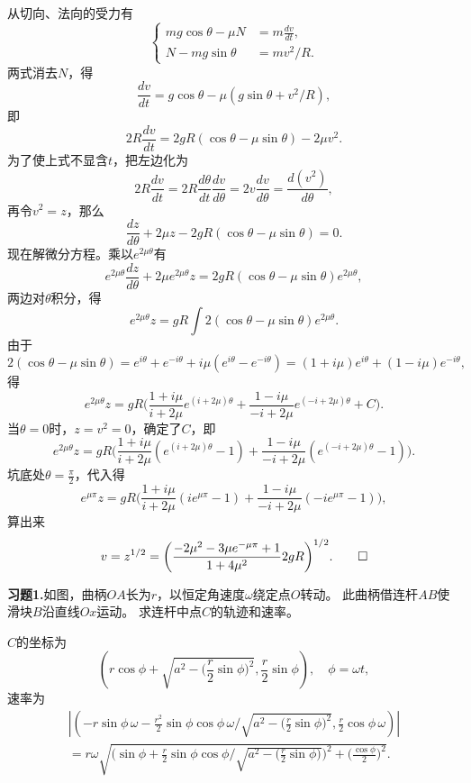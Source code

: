 \begin{proofc}[解答] 从切向、法向的受力有
    \begin{equation*}\left\{\begin{aligned}
        mg\cos\theta-\mu N&=m\frac{dv}{dt},\\
        N-mg\sin\theta&=mv^2/R.
    \end{aligned}\right.\end{equation*}
    两式消去$N$，得
    $$\frac{dv}{dt}=g\cos\theta-\mu(g\sin\theta+v^2/R),$$
    即
    $$2R\frac{dv}{dt}=2gR(\cos\theta-\mu\sin\theta)-2\mu v^2.$$
    为了使上式不显含$t$，把左边化为
    $$2R\frac{dv}{dt}=2R\frac{d\theta}{dt}\frac{dv}{d\theta}
    =2v\frac{dv}{d\theta}=\frac{d(v^2)}{d\theta},$$
    再令$v^2=z$，那么
    $$\frac{dz}{d\theta}+2\mu z-2gR(\cos\theta-\mu\sin\theta)=0.$$
    现在解微分方程。乘以$e^{2\mu\theta}$有
    $$e^{2\mu\theta}\frac{dz}{d\theta}+2\mu e^{2\mu\theta}z
    =2gR(\cos\theta-\mu\sin\theta)e^{2\mu\theta},$$
    两边对$\theta$积分，得
    $$e^{2\mu\theta}z=gR\int2(\cos\theta-\mu\sin\theta)e^{2\mu\theta}.$$
    由于
    $$2(\cos\theta-\mu\sin\theta)
    =e^{i\theta}+e^{-i\theta}+i\mu(e^{i\theta}-e^{-i\theta})
    =(1+i\mu)e^{i\theta}+(1-i\mu)e^{-i\theta},$$
    得
    $$e^{2\mu\theta}z=gR\bigg(\frac{1+i\mu}{i+2\mu}e^{(i+2\mu)\theta}
    +\frac{1-i\mu}{-i+2\mu}e^{(-i+2\mu)\theta}+C\bigg).$$
    当$\theta=0$时，$z=v^2=0$，确定了$C$，即
    $$e^{2\mu\theta}z=gR\bigg(\frac{1+i\mu}{i+2\mu}(e^{(i+2\mu)\theta}-1)
    +\frac{1-i\mu}{-i+2\mu}(e^{(-i+2\mu)\theta}-1)\bigg).$$
    坑底处$\theta=\frac{\pi}{2}$，代入得
    $$e^{\mu\pi}z=gR\bigg(\frac{1+i\mu}{i+2\mu}(ie^{\mu\pi}-1)
    +\frac{1-i\mu}{-i+2\mu}(-ie^{\mu\pi}-1)\bigg),$$
    算出来
    $$v=z^{1/2}
    =\bigg(\frac{-2\mu^2-3\mu e^{-\mu\pi}+1}{1+4\mu^2}2gR\bigg)^{1/2}.\qedhere$$
\end{proofc}
\textbf{习题1.}如图，曲柄$OA$长为$r$，以恒定角速度$\omega$绕定点$O$转动。
此曲柄借连杆$AB$使滑块$B$沿直线$Ox$运动。
求连杆中点$C$的轨迹和速率。
\begin{proofc}[解答]
    $C$的坐标为
    $$(r\cos\phi+\sqrt{a^2-\Big(\frac{r}{2}\sin\phi\Big)^2},\frac{r}{2}\sin\phi),
    \quad \phi=\omega t,$$
    速率为
    \begin{align*}
        |(-r\sin\phi\,\omega-\frac{r^2}{2}\sin\phi\cos\phi\,\omega\Big/
        \sqrt{a^2-\Big(\frac{r}{2}\sin\phi\Big)^2},
        \frac{r}{2}\cos\phi\,\omega)|\\
        =r\omega\sqrt{\bigg(\sin\phi+\frac{r}{2}\sin\phi\cos\phi\Big/
        \sqrt{a^2-\Big(\frac{r}{2}\sin\phi\Big)}\bigg)^2
        +\Big(\frac{\cos\phi}{2}\Big)^2}.
    \end{align*}
\end{proofc}
